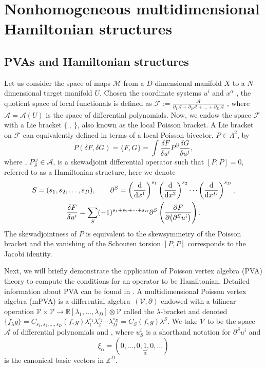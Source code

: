 \documentclass[pdftex]{sigma}
\numberwithin{equation}{section}
\begin{document}
\section{Nonhomogeneous multidimensional Hamiltonian structures}
\subsection{PVAs and Hamiltonian structures}
Let us consider the space of maps $\mathcal{M}$ from a $D$-dimensional manifold $X$ to a $N$-dimensional target manifold $U$. Chosen the coordinate systems ${u^i}$ and ${x^\alpha}$ , the quotient space of local functionals is defined as $\mathcal{F}:=\frac{\mathcal{A}}{\partial_1\mathcal{A}+\partial_2\mathcal{A}+\dots+\partial_D\mathcal{A}}$ \cite{olver1993applications}, where $\mathcal{A}=\mathcal{A}(U)$ is the space of differential polynomials. Now, we endow the space $\mathcal{F}$ with a Lie bracket $\lbrace \ , \ \rbrace$, also known as the local Poisson bracket.
A Lie bracket on $\mathcal F$ can equivalently defined in terms of a local Poisson bivector, $P \in \Lambda^2$, by
\begin{equation}\label{eq:pb-def}
P(\delta F,\delta G)=\lbrace F,G \rbrace =\int \frac{\delta F}{\delta u^i}P^{ij}\frac{\delta G}{\delta u^j},
\end{equation}
where , $P^{ij}_S \in \mathcal{A}$, is a skewadjoint differential operator such that $[P,P]=0$, referred to as a Hamiltonian structure, here we denote
\begin{gather*}
S=(s_1,s_2,\dots,s_D), \qquad \partial^S=\left(\frac{{\rm d}}{{\rm d}x^1}\right)^{s_1}\left(\frac{\rm d}{{\rm d}x^2}\right)^{s_2}\cdots\left(\frac{\rm d}{{\rm d}x^D}\right)^{s_D}, \\ \frac{\delta F}{\delta u^i}=\sum\limits_{S}(-1)^{s_1+s_2+\dots+s_D}\partial^S\left(\frac{\partial F}{\partial\big(\partial^Su^i\big)}\right).
\end{gather*}
 The skewadjointness of $P$ is equivalent to the skewsymmetry of the Poisson bracket and the vanishing of the Schouten torsion $[P,P]$ \cite{olver1993applications} corresponds to the Jacobi identity.

Next, we will briefly demonstrate the application of Poisson vertex algebra (PVA) theory to compute the conditions for an operator to be Hamiltonian. Detailed information about PVA can be found in \cite{barakat2009poisson}. A multidimensional Poisson vertex algebra (mPVA) is a differential algebra~$(\mathcal{V}, \partial)$ endowed with
a bilinear operation $\mathcal{V} \times \mathcal{V}\rightarrow \mathbb{R}[\lambda_1,\dots,\lambda_D] \otimes\mathcal{V}$ called the $\lambda$-bracket and denoted $\lbrace f_{\lambda} g\rbrace=C_{s_1,s_2,\dots,s_D}(f,g)\lambda^{s_1}_1\lambda^{s_2}_2\cdots\lambda^{s_D}_D=C_S(f,g)\lambda^S$. We take $\mathcal{V}$ to be the space $\mathcal{A}$ of differential polynomials and , where $u^i_S$ is a shorthand notation for $\partial^S u^i$ and
 \[
\xi_{\alpha}=(0,\ldots,0,\underbrace{1}_{\alpha},0,\ldots)
\] is the canonical basic vectors in $\mathbb{Z}^D$.
\end{document}
